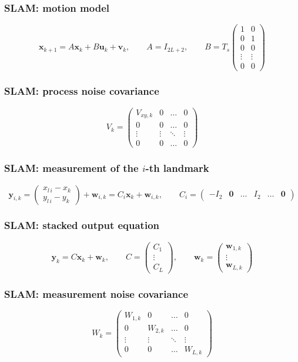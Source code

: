 \subsubsection{SLAM: motion model}
\begin{equation*}
    \mathbf x_{k+1}=A\mathbf x_k+B\mathbf u_k+\mathbf v_k,\qquad A=I_{2L+2},\qquad B=T_s\begin{pmatrix}1&0\\0&1\\0&0\\\vdots&\vdots\\0&0\end{pmatrix}
\end{equation*}

\subsubsection{SLAM: process noise covariance}
\begin{equation*}
    V_k=\begin{pmatrix}V_{xy,k}&0&\dots&0\\0&0&\dots&0\\\vdots&\vdots&\ddots&\vdots\\0&0&\dots&0\end{pmatrix}
\end{equation*}

\subsubsection{SLAM: measurement of the $i$-th landmark}
\begin{equation*}
    \mathbf y_{i,k}=\begin{pmatrix}x_{l\,i}-x_k\\y_{l\,i}-y_k\end{pmatrix}+\mathbf w_{i,k}=C_i\mathbf x_k+\mathbf w_{i,k},\qquad C_i=\begin{pmatrix}-I_2&\mathbf 0&\dots&I_2&\dots&\mathbf 0\end{pmatrix}
\end{equation*}

\subsubsection{SLAM: stacked output equation}
\begin{equation*}
    \mathbf y_k=C\mathbf x_k+\mathbf w_k,\qquad C=\begin{pmatrix}C_1\\\vdots\\C_L\end{pmatrix},\qquad\mathbf w_k=\begin{pmatrix}\mathbf w_{1,k}\\\vdots\\\mathbf w_{L,k}\end{pmatrix}
\end{equation*}

\subsubsection{SLAM: measurement noise covariance}
\begin{equation*}
    W_k=\begin{pmatrix}W_{1,k}&0&\dots&0\\0&W_{2,k}&\dots&0\\\vdots&\vdots&\ddots&\vdots\\0&0&\dots&W_{L,k}\end{pmatrix}
\end{equation*}